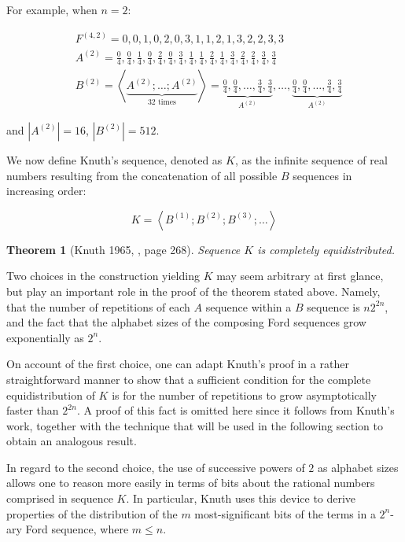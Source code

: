 \documentclass[11pt,a4paper]{tesis}
\theoremstyle{plain}
\newtheorem*{theorem*}{Theorem}
\theoremstyle{definition}
\begin{document}
For example, when $n = 2$:

\begin{equation*}
  \begin{aligned}
    & F^{(4, 2)} = 0, 0, 1, 0, 2, 0, 3, 1, 1, 2, 1, 3, 2, 2, 3, 3 \\
    & A^{(2)} = \frac{0}{4}, \frac{0}{4}, \frac{1}{4}, \frac{0}{4}, \frac{2}{4}, \frac{0}{4}, \frac{3}{4}, \frac{1}{4}, \frac{1}{4}, \frac{2}{4}, \frac{1}{4}, \frac{3}{4}, \frac{2}{4}, \frac{2}{4}, \frac{3}{4}, \frac{3}{4} \\
    & B^{(2)} = \left< \underbrace{A^{(2)} ; \dots ; A^{(2)}}_{32 \text{ times}} \right> = \underbrace{\frac{0}{4}, \frac{0}{4}, \dots, \frac{3}{4}, \frac{3}{4}}_{A^{(2)}}, \dots, \underbrace{\frac{0}{4}, \frac{0}{4}, \dots, \frac{3}{4}, \frac{3}{4}}_{A^{(2)}}
  \end{aligned}
\end{equation*}

and $|A^{(2)}| = 16$, $|B^{(2)}| = 512$.

We now define Knuth's sequence, denoted as $K$, as the infinite sequence of real numbers resulting from the concatenation of all possible $B$ sequences in increasing order:

\begin{equation*}
  K = \left< B^{(1)} ; B^{(2)} ;  B^{(3)} ; \dots \right>
\end{equation*}

\begin{theorem*}[Knuth 1965, \cite{knuth-1965}, page 268]
  Sequence $K$ is completely equidistributed.
\end{theorem*}

Two choices in the construction yielding $K$ may seem arbitrary at first glance, but play an important role in the proof of the theorem stated above. Namely, that the number of repetitions of each $A$ sequence within a $B$ sequence is $n 2^{2n}$, and the fact that the alphabet sizes of the composing Ford sequences grow exponentially as $2^n$.

On account of the first choice, one can adapt Knuth's proof in a rather straightforward manner to show that a sufficient condition for the complete equidistribution of $K$ is for the number of repetitions to grow asymptotically faster than $2^{2n}$. A proof of this fact is omitted here since it follows from Knuth's work, together with the technique that will be used in the following section to obtain an analogous result.

In regard to the second choice, the use of successive powers of $2$ as alphabet sizes allows one to reason more easily in terms of bits about the rational numbers comprised in sequence $K$. In particular, Knuth uses this device to derive properties of the distribution of the $m$ most-significant bits of the terms in a $2^n$-ary Ford sequence, where $m \le n$.
\end{document}
